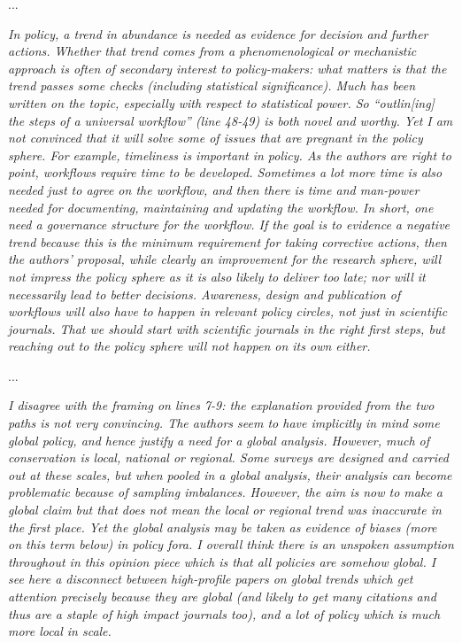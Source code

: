 \documentclass[11pt,letter]{article}
\begin{document}
...

\begin{mybox}
\emph{In policy, a trend in abundance is needed as evidence for decision and further actions. Whether
that trend comes from a phenomenological or mechanistic approach is often of secondary
interest to policy-makers: what matters is that the trend passes some checks (including
statistical significance). Much has been written on the topic, especially with respect to
statistical power. So “outlin[ing] the steps of a universal workflow” (line 48-49) is both novel
and worthy. Yet I am not convinced that it will solve some of issues that are pregnant in the
policy sphere. For example, timeliness is important in policy. As the authors are right to point,
workflows require time to be developed. Sometimes a lot more time is also needed just to agree
on the workflow, and then there is time and man-power needed for documenting, maintaining
and updating the workflow. In short, one need a governance structure for the workflow. If the
goal is to evidence a negative trend because this is the minimum requirement for taking
corrective actions, then the authors’ proposal, while clearly an improvement for the research
sphere, will not impress the policy sphere as it is also likely to deliver too late; nor will it
necessarily lead to better decisions. Awareness, design and publication of workflows will also
have to happen in relevant policy circles, not just in scientific journals. That we should start
with scientific journals in the right first steps, but reaching out to the policy sphere will not
happen on its own either.}  
\end{mybox}

...

\begin{mybox}
\emph{I disagree with the framing on lines 7-9: the explanation provided from the two paths is not
very convincing. The authors seem to have implicitly in mind some global policy, and hence
justify a need for a global analysis. However, much of conservation is local, national or
regional. Some surveys are designed and carried out at these scales, but when pooled in a
global analysis, their analysis can become problematic because of sampling imbalances.
However, the aim is now to make a global claim but that does not mean the local or regional
trend was inaccurate in the first place. Yet the global analysis may be taken as evidence of
biases (more on this term below) in policy fora. I overall think there is an unspoken assumption
throughout in this opinion piece which is that all policies are somehow global. I see here a
disconnect between high-profile papers on global trends which get attention precisely because
they are global (and likely to get many citations and thus are a staple of high impact journals
too), and a lot of policy which is much more local in scale.}  
\end{mybox}
\end{document}
